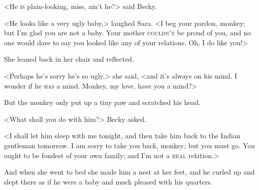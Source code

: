 <He \textsc{is} plain-looking, miss, ain't he?> said Becky.

<He looks like a very ugly baby,> laughed Sara. <I beg your pardon, monkey; but I'm glad you are not a baby. Your mother \textsc{couldn't} be proud of you, and no one would dare to say you looked like any of your relations. Oh, I do like you!>

She leaned back in her chair and reflected.

<Perhaps he's sorry he's so ugly,> she said, <and it's always on his mind. I wonder if he \textsc{has} a mind. Monkey, my love, have you a mind?>

But the monkey only put up a tiny paw and scratched his head.

<What shall you do with him?> Becky asked.

<I shall let him sleep with me tonight, and then take him back to the Indian gentleman tomorrow. I am sorry to take you back, monkey; but you must go. You ought to be fondest of your own family; and I'm not a \textsc{real} relation.>

And when she went to bed she made him a nest at her feet, and he curled up and slept there as if he were a baby and much pleased with his quarters.